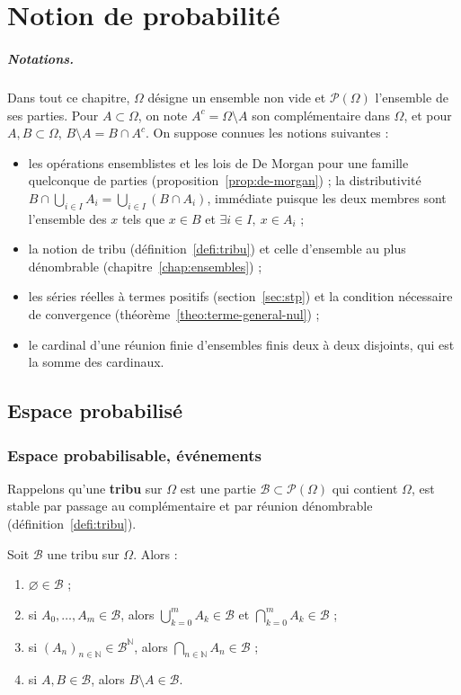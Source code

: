 \chapter{Notion de probabilité}
\label{chap:probabilites}

\paragraph{Notations.} Dans tout ce chapitre, $\Omega$ désigne un ensemble non vide et $\mathcal{P}(\Omega)$ l'ensemble de ses parties. Pour $A\subset\Omega$, on note $A^c=\Omega\setminus A$ son complémentaire dans $\Omega$, et pour $A,B\subset\Omega$, $B\setminus A=B\cap A^c$. On suppose connues les notions suivantes :
\begin{itemize}
\item les opérations ensemblistes et les lois de De Morgan pour une famille quelconque de parties (proposition~\ref{prop:de-morgan}) ; la distributivité $B\cap\bigcup_{i\in I}A_i=\bigcup_{i\in I}(B\cap A_i)$, immédiate puisque les deux membres sont l'ensemble des $x$ tels que $x\in B$ et $\exists i\in I,\ x\in A_i$ ;
\item la notion de tribu (définition~\ref{defi:tribu}) et celle d'ensemble au plus dénombrable (chapitre~\ref{chap:ensembles}) ;
\item les séries réelles à termes positifs (section~\ref{sec:stp}) et la condition nécessaire de convergence (théorème~\ref{theo:terme-general-nul}) ;
\item le cardinal d'une réunion finie d'ensembles finis deux à deux disjoints, qui est la somme des cardinaux.
\end{itemize}

\section{Espace probabilisé}

\subsection{Espace probabilisable, événements}

Rappelons qu'une \textbf{tribu} sur $\Omega$ est une partie $\mathcal{B}\subset\mathcal{P}(\Omega)$ qui contient $\Omega$, est stable par passage au complémentaire et par réunion dénombrable (définition~\ref{defi:tribu}).

\begin{prop}
\label{prop:tribu-stabilite}
Soit $\mathcal{B}$ une tribu sur $\Omega$. Alors :
\begin{enumerate}
\item $\varnothing\in\mathcal{B}$ ;
\item si $A_0,\dots,A_m\in\mathcal{B}$, alors $\bigcup_{k=0}^mA_k\in\mathcal{B}$ et $\bigcap_{k=0}^mA_k\in\mathcal{B}$ ;
\item si $(A_n)_{n\in\mathbb{N}}\in\mathcal{B}^{\mathbb{N}}$, alors $\bigcap_{n\in\mathbb{N}}A_n\in\mathcal{B}$ ;
\item si $A,B\in\mathcal{B}$, alors $B\setminus A\in\mathcal{B}$.
\end{enumerate}
\end{prop}

